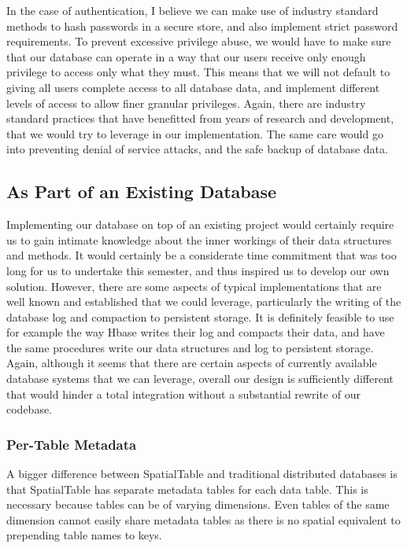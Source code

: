 \documentclass[11pt]{article}
\begin{document}
In the case of authentication, I believe we can make use of industry standard methods to hash passwords in a secure store, and also implement strict password requirements. To prevent excessive privilege abuse, we would have to make sure that our database can operate in a way that our users receive only enough privilege to access only what they must. This means that we will not default to giving all users complete access to all database data, and implement different levels of access to allow finer granular privileges. Again, there are industry standard practices that have benefitted from years of research and development, that we would try to leverage in our implementation. The same care would go into preventing denial of service attacks, and the safe backup of database data.

\subsection{As Part of an Existing Database}
Implementing our database on top of an existing project would certainly require us to gain intimate knowledge about the inner workings of their data structures and methods. It would certainly be a considerate time commitment that was too long for us to undertake this semester, and thus inspired us to develop our own solution. However, there are some aspects of typical implementations that are well known and established that we could leverage, particularly the writing of the database log and compaction to persistent storage. It is definitely feasible to use for example the way Hbase writes their log and compacts their data, and have the same procedures write our data structures and log to persistent storage. Again, although it seems that there are certain aspects of currently available database systems that we can leverage, overall our design is sufficiently different that would hinder a total integration without a substantial rewrite of our codebase.

\subsubsection{Per-Table Metadata}

A bigger difference between SpatialTable and traditional distributed databases is that SpatialTable has separate metadata tables for each data table.  This is necessary because tables can be of varying dimensions.  Even tables of the same dimension cannot easily share metadata tables as there is no spatial equivalent to prepending table names to keys.
\end{document}
